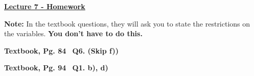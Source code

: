 \documentclass[12pt]{article} %
\begin{document}
	\renewcommand*{\coursecode}{MATH 235} %
	\renewcommand*{\assgnnumber}{Assignment 1} %
	\renewcommand*{\submdate}{September 14, 2021} %
	\renewcommand*{\studentfname}{Abdullah} %
	\renewcommand*{\studentlname}{Zubair} %
    \renewcommand*{\proofname}{Proof:}

	\renewcommand\qedsymbol{$\blacksquare$}
	\setfigpath
	\fancyhfoffset[L,O]{0pt} %




\begin{center}
	\textbf{\underline{\Huge{Lecture 7 - Homework}}}
\end{center}

\textbf{Note: }In the textbook questions, they will ask you to state the restrictions on the variables. \textbf{You
don't have to do this.}

\begin{qstn}
  \textbf{Textbook, Pg. 84\,\,\, Q6. (Skip f))}
\end{qstn}

\begin{qstn}
  \textbf{Textbook, Pg. 94 \,\,\,Q1. b), d)}
\end{qstn}
\end{document}
